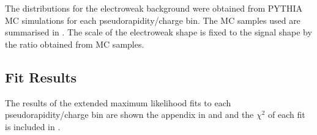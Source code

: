 The \ETm distributions for the {electroweak} background were obtained from
PYTHIA\cite{pythia} MC simulations for each pseudorapidity/charge bin.  The MC samples used
are summarised in .  The scale of the {electroweak}
shape is fixed to the signal \ETm shape by the ratio obtained from MC samples.

\subsection{Fit Results}

The results of the extended maximum likelihood fits to each pseudorapidity/charge
bin are shown the appendix in  and  and
the $\chi^2$ of each fit is included in .



